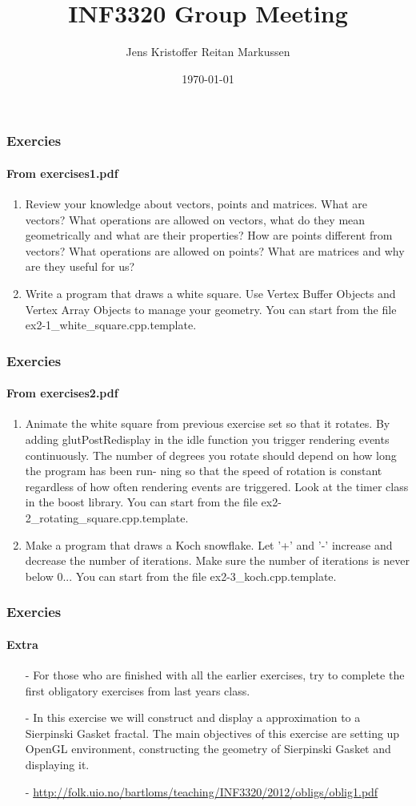 \documentclass[11pt]{beamer}
\title{INF3320 Group Meeting}
\author{Jens Kristoffer Reitan Markussen}
\date{\today}
\begin{document}
	\begin{frame}
	\frametitle{Exercies}
	\framesubtitle{From exercises1.pdf}
	\begin{enumerate}
	\item Review your knowledge about vectors, points and matrices. What are vectors? What operations are allowed on vectors, what do they mean geometrically and what are their properties? How are points different from vectors? What operations are allowed on points? What
are matrices and why are they useful for us?

	\item Write a program that draws a white square. Use Vertex Buffer Objects and Vertex Array Objects to manage your geometry. You can start from the file ex2-1\_white\_square.cpp.template.

	\end{enumerate}
	\end{frame}
	
	\begin{frame}
	\frametitle{Exercies}
	\framesubtitle{From exercises2.pdf}
	\begin{enumerate}
	\item Animate the white square from previous exercise set so that it rotates. By adding glutPostRedisplay
in the idle function you trigger rendering events continuously.
The number of degrees you rotate should depend on how long the program has been run-
ning so that the speed of rotation is constant regardless of how often rendering events are
triggered. Look at the timer class in the boost library.
You can start from the file ex2-2\_rotating\_square.cpp.template.
	\item Make a program that draws a Koch snowflake. Let ’+’ and ’-’ increase and decrease the
number of iterations. Make sure the number of iterations is never below 0...
You can start from the file ex2-3\_koch.cpp.template.



	\end{enumerate}
	\end{frame}
	
	\begin{frame}
	\frametitle{Exercies}
	\framesubtitle{Extra}
	
	\begin{enumerate}
	\item[-]	For those who are finished with all the earlier exercises, try to complete the first obligatory exercises from last years class.
	\item[-] In this exercise we will construct and display a approximation to a Sierpinski Gasket fractal. The
main objectives of this exercise are setting up OpenGL environment, constructing the geometry
of Sierpinski Gasket and displaying it.
	\item[-] \href{http://folk.uio.no/bartloms/teaching/INF3320/2012/obligs/oblig1.pdf}{http://folk.uio.no/bartloms/teaching/INF3320/2012/obligs/oblig1.pdf}
\end{enumerate}		

	 


	\end{frame}
\end{document}
